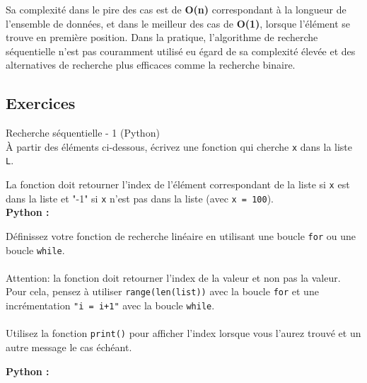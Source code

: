     Sa complexité dans le pire des cas est de \textbf{O(n)} correspondant à la longueur de l'ensemble de données, et dans le meilleur des cas de \textbf{O(1)}, lorsque l'élément se trouve en première position. Dans la pratique, l'algorithme de recherche séquentielle n'est pas couramment utilisé eu égard de sa complexité élevée et des alternatives de recherche plus efficaces comme la recherche binaire.\\
    
    
    \subsection{Exercices}
    
    \begin{Exercice}[10 minutes] Recherche séquentielle - 1 (Python)\\
    
    À partir des éléments ci-dessous, écrivez une fonction qui cherche \lstinline{x} dans la liste \lstinline{L}.
    
    La fonction doit retourner l'index de l'élément correspondant de la liste si \lstinline{x} est dans la liste et "-1" si \lstinline{x} n'est pas dans la liste (avec \lstinline{x = 100}).\\
    
    \textbf{Python :}
      
    
    \begin{conseil}
        Définissez votre fonction de recherche linéaire en utilisant une boucle \lstinline{for} ou une boucle \lstinline{while}.\\\\
        Attention: la fonction doit retourner l'index de la valeur et non pas la valeur. Pour cela, pensez à utiliser \lstinline{range(len(list))} avec la boucle \lstinline{for} et une incrémentation \lstinline{"i = i+1"} avec la boucle \lstinline{while}.\\\\
        Utilisez la fonction \lstinline{print()} pour afficher l'index lorsque vous l'aurez trouvé et un autre message le cas échéant. 
    \end{conseil}
        
    \begin{solution}
    \textbf{Python :}
        
        
    \end{solution}
    
    \end{Exercice}
    
